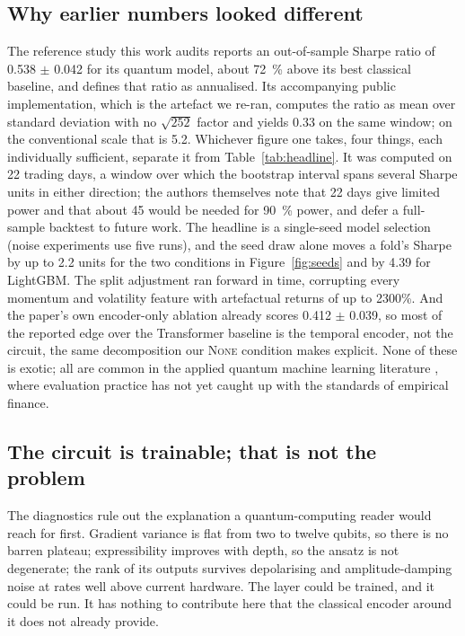 \subsection{Why earlier numbers looked different}
The reference study this work audits \citep{chen2025quantumb} reports an
out-of-sample Sharpe ratio of \num{0.538} $\pm$ \num{0.042} for its quantum
model, about \SI{72}{\percent} above its best classical baseline, and defines
that ratio as annualised. Its accompanying public implementation, which is the
artefact we re-ran, computes the ratio as mean over standard deviation with no
$\sqrt{252}$ factor and yields \num{0.33} on the same window; on the
conventional scale that is \num{5.2}. Whichever figure one takes, four things,
each individually sufficient, separate it from Table~\ref{tab:headline}. It
was computed on \num{22} trading days, a window over which the bootstrap
interval spans several Sharpe units in either direction; the authors
themselves note that \num{22} days give limited power and that about \num{45}
would be needed for \SI{90}{\percent} power, and defer a full-sample backtest
to future work. The headline is a single-seed model selection (noise
experiments use five runs), and the seed draw alone moves a fold's Sharpe by
up to \num{2.2} units for the two conditions in Figure~\ref{fig:seeds} and by
\num{4.39} for LightGBM. The split adjustment
ran forward in time, corrupting every momentum and volatility feature with
artefactual returns of up to \num{2300}\%. And the paper's own encoder-only
ablation already scores \num{0.412} $\pm$ \num{0.039}, so most of the reported
edge over the Transformer baseline is the temporal encoder, not the circuit, the same decomposition our \textsc{None} condition makes explicit. None of
these is exotic; all are common in the applied quantum machine learning
literature \citep{shen2026quantum,bowles2024better}, where evaluation practice
has not yet caught up with the standards of empirical finance.

\subsection{The circuit is trainable; that is not the problem}
The diagnostics rule out the explanation a quantum-computing reader would reach
for first. Gradient variance is flat from two to twelve qubits, so there is no
barren plateau; expressibility improves with depth, so the ansatz is not
degenerate; the rank of its outputs survives depolarising and amplitude-damping
noise at rates well above current hardware. The layer could be trained, and it
could be run. It has nothing to contribute here that the classical
encoder around it does not already provide.

